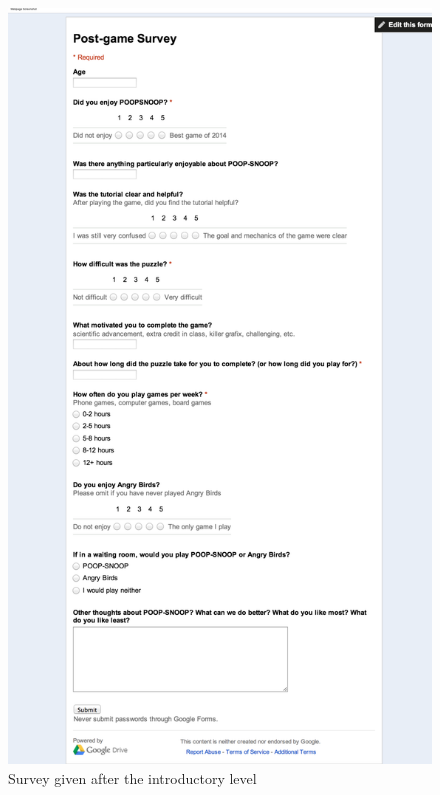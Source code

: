 \documentclass[12pt]{ucthesis}
\begin{document}
\begin{appendices}
{   \begin{figure}[H]
   \centering
   \includegraphics[width=115mm]{images/Post-game.pdf}
   \caption{Survey given after the introductory level}
   \end{figure}
}

\end{appendices}
\end{document}

